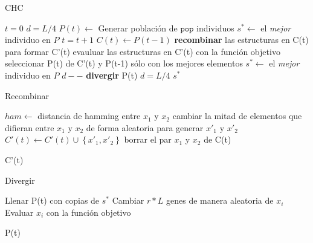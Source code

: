 \begin{algorithm}
\caption{CHC}
\label{chc}
\begin{algorithmic}[1]


\State $t=0$
\State $d=L/4$
\State $P(t) \gets$ Generar población de $\texttt{pop}$ individuos
\State $s^* \gets $ el \emph{mejor} individuo en $P$
	\State $t=t+1$
	\State $C(t) \gets P(t-1)$
	\State \textbf{recombinar} las estructuras en C(t) para formar C'(t)
	\State evauluar las estructuras en C'(t) con la función objetivo
	\State seleccionar P(t) de C'(t) y P(t-1) sólo con los mejores elementos
		\State $s^* \gets$ el \emph{mejor} individuo en $P$
	\EndIf
		\State $d--$
	\EndIf
		\State \textbf{divergir} P(t)
		\State $d=L/4$
	\EndIf
\EndWhile
\State \Return $s^*$

\end{algorithmic}
\end{algorithm}

\begin{algorithm}
\caption{Recombinar}
\label{recombinar}
\begin{algorithmic}


	\State $ham \gets$ distancia de hamming entre $x_1$ y $x_2$
		\State cambiar la mitad de elementos que difieran entre $x_1$ y $x_2$ de forma aleatoria para generar $x'_1$ y $x'_2$
		\State $C'(t) \gets C'(t) \cup \left\{x'_1,x'_2\right\}$
	\Else
		\State borrar el par $x_1$ y $x_2$ de C(t)
	\EndIf
\EndFor

\State \Return C'(t)

\end{algorithmic}
\end{algorithm}

\begin{algorithm}
\caption{Divergir}
\label{Divergir}
\begin{algorithmic}


\State Llenar P(t) con copias de $s^*$
	\State Cambiar $r*L$ genes de manera aleatoria de $x_i$
	\State Evaluar $x_i$ con la función objetivo
\EndFor

\State \Return P(t)

\end{algorithmic}
\end{algorithm}

